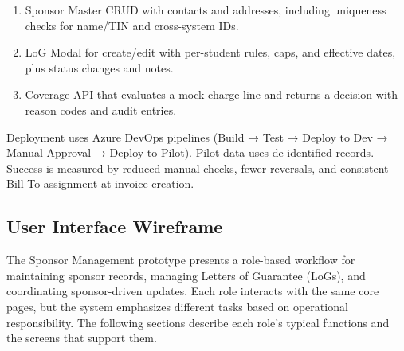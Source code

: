         \begin{enumerate}
            \item Sponsor Master CRUD with contacts and addresses, including uniqueness checks for name/TIN and cross-system IDs.
            \item LoG Modal for create/edit with per-student rules, caps, and effective dates, plus status changes and notes.
            \item Coverage API that evaluates a mock charge line and returns a decision with reason codes and audit entries.
        \end{enumerate}

        Deployment uses Azure DevOps pipelines (Build → Test → Deploy to Dev → Manual Approval → Deploy to Pilot). Pilot data uses de-identified records. Success is measured by reduced manual checks, fewer reversals, and consistent Bill-To assignment at invoice creation.

        \subsection{User Interface Wireframe}
        The Sponsor Management prototype presents a role-based workflow for maintaining sponsor records, managing Letters of Guarantee (LoGs), and coordinating sponsor-driven updates. Each role interacts with the same core pages, but the system emphasizes different tasks based on operational responsibility. The following sections describe each role’s typical functions and the screens that support them.
        \pagebreak

